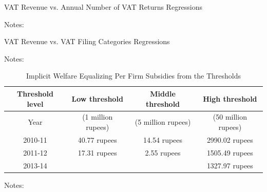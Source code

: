 \newpage{}

\begin{table}[t]
\caption{VAT Revenue vs. Annual Number of VAT Returns Regressions}

{\small{}{}{}\label{tab:Number reports regressions}}{\small \par}

 
\begin{centering}
 
\par\end{centering}
{\footnotesize{}{}{}Notes: }{\footnotesize \par}
\end{table}

\newpage{}

\begin{table}[t]
\caption{VAT Revenue vs. VAT Filing Categories Regressions}

{\small{}{}{}\label{tab:Filing category regressions}}{\small \par}

 
\begin{centering}
 
\par\end{centering}
{\footnotesize{}{}{}Notes: }{\footnotesize \par}
\end{table}

\newpage{}
\begin{table}[t]
\caption{Implicit Welfare Equalizing Per Firm Subsidies from the Thresholds}

{\small{}{}{}\label{tab:Implicit subsidies}}{\small \par}
\begin{centering}
\begin{tabular}{|c|c|c|c|}
\hline 
Threshold level  & Low threshold  & Middle threshold  & High threshold \tabularnewline
\hline 
Year  & (1 million rupees)  & (5 million rupees)  & (50 million rupees)\tabularnewline
\hline 
\hline 
2010-11  & 40.77 rupees  & 14.54 rupees  & 2990.02 rupees \tabularnewline
\hline 
2011-12  & 17.31 rupees & 2.55 rupees  & 1505.49 rupees\tabularnewline
\hline 
2013-14  &  &  & 1327.97 rupees\tabularnewline
\hline 
\end{tabular}
\par\end{centering}
{\footnotesize{}{}{}Notes: }{\footnotesize \par}
\end{table}

